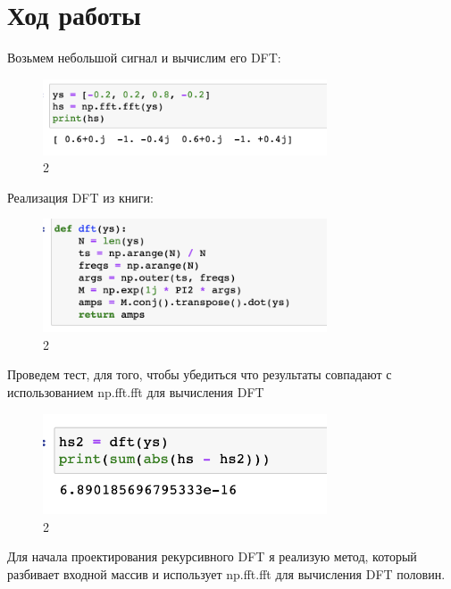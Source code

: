 \documentclass[10pt,a4paper,oneside]{article}
\begin{document}
\section{Ход работы}

Возьмем небольшой сигнал и вычислим его DFT:

\begin{figure}[H]
        \centering
        \includegraphics[width=0.75\textwidth]{pics/1.png}
        \caption{2}
        \label{fig:first}
\end{figure}

Реализация DFT из книги:

\begin{figure}[H]
        \centering
        \includegraphics[width=0.75\textwidth]{pics/2.png}
        \caption{2}
        \label{fig:first}
\end{figure}

Проведем тест, для того, чтобы убедиться что результаты совпадают с использованием np.fft.fft для вычисления DFT

\begin{figure}[H]
        \centering
        \includegraphics[width=0.75\textwidth]{pics/3.png}
        \caption{2}
        \label{fig:first}
\end{figure}

Для начала проектирования рекурсивного DFT я реализую метод, который разбивает входной массив и использует np.fft.fft для вычисления DFT половин.
\end{document}
